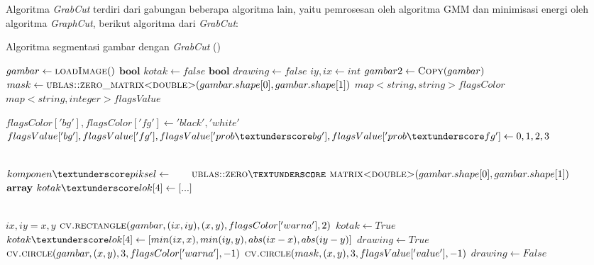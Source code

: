Algoritma \emph{GrabCut} terdiri dari gabungan beberapa algoritma lain, yaitu 
pemrosesan oleh algoritma GMM dan minimisasi energi oleh algoritma \emph{GraphCut},
berikut algoritma dari \emph{GrabCut}:  

\begin{algorithm}                     
\caption{Algoritma segmentasi gambar dengan \emph{GrabCut} (\cite{Rother:2004})}          
\label{algo:grabcut}                          
\begin{algorithmic}                    %
    \State $gambar \gets \Call{loadImage}$  
    \State $\textbf{bool } kotak \gets false$ 
    \State $\textbf{bool } drawing \gets false$ 
    \State $iy, ix \gets int$
    \State $gambar2 \gets \Call{Copy}{gambar}$
    \State $mask \gets \Call{ublas::zero\textunderscore matrix<double>}{gambar.shape[0], gambar.shape[1]}$
    \State $map<string, string> flagsColor$
    \State $map<string, integer> flagsValue$
    
    \State $flagsColor['bg'], flagsColor['fg']  \gets 'black', 'white'$
    \State $flagsValue['bg'], flagsValue['fg'], flagsValue['prob\textunderscore bg'], flagsValue['prob\textunderscore fg'] \newline
     \gets 0, 1, 2, 3$
    
    \\
    \State $komponen\textunderscore piksel \gets \newline
    \hspace*{2em} \Call{ublas::zero\textunderscore matrix<double>}{gambar.shape[0], gambar.shape[1]}$
    \State $\textbf{array } kotak\textunderscore lok[4] \gets [...]$

    \\
            \State $ix, iy = x, y$
            \State $\Call{cv.rectangle}{gambar, (ix, iy), (x, y), flagsColor['warna'], 2}$
            \State $kotak \gets True$
            \State $kotak\textunderscore lok[4] \gets [min(ix, x), min(iy, y), abs(ix-x), abs(iy-y)]$
        \EndIf 
            \State $drawing \gets True$
            \State $\Call{cv.circle}{gambar, (x, y), 3, flagsColor['warna'], -1}$
            \State $\Call{cv.circle}{mask, (x, y), 3, flagsValue['value'], -1}$
            \State $drawing \gets False$
        \EndIf 
    \EndFunction
    \\
\end{algorithmic}
\end{algorithm}

